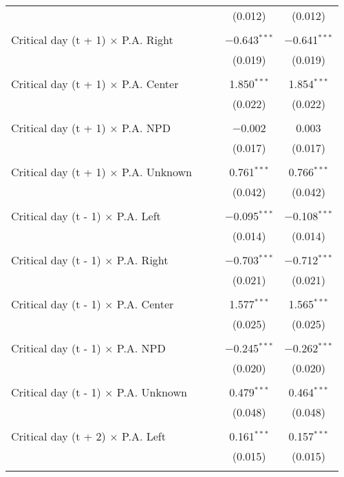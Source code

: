 \documentclass[
]{article}
\begin{document}
\begin{table}[!htbp]
{\begin{tabular}{@{\extracolsep{5pt}}lcccc}
  &  &  & (0.012) & (0.012) \\ 
  & & & & \\ 
 Critical day (t + 1) $\times$ P.A. Right &  &  & $-$0.643$^{***}$ & $-$0.641$^{***}$ \\ 
  &  &  & (0.019) & (0.019) \\ 
  & & & & \\ 
 Critical day (t + 1) $\times$ P.A. Center &  &  & 1.850$^{***}$ & 1.854$^{***}$ \\ 
  &  &  & (0.022) & (0.022) \\ 
  & & & & \\ 
 Critical day (t + 1) $\times$ P.A. NPD &  &  & $-$0.002 & 0.003 \\ 
  &  &  & (0.017) & (0.017) \\ 
  & & & & \\ 
 Critical day (t + 1) $\times$ P.A. Unknown &  &  & 0.761$^{***}$ & 0.766$^{***}$ \\ 
  &  &  & (0.042) & (0.042) \\ 
  & & & & \\ 
 Critical day (t - 1) $\times$ P.A. Left &  &  & $-$0.095$^{***}$ & $-$0.108$^{***}$ \\ 
  &  &  & (0.014) & (0.014) \\ 
  & & & & \\ 
 Critical day (t - 1) $\times$ P.A. Right &  &  & $-$0.703$^{***}$ & $-$0.712$^{***}$ \\ 
  &  &  & (0.021) & (0.021) \\ 
  & & & & \\ 
 Critical day (t - 1) $\times$ P.A. Center &  &  & 1.577$^{***}$ & 1.565$^{***}$ \\ 
  &  &  & (0.025) & (0.025) \\ 
  & & & & \\ 
 Critical day (t - 1) $\times$ P.A. NPD &  &  & $-$0.245$^{***}$ & $-$0.262$^{***}$ \\ 
  &  &  & (0.020) & (0.020) \\ 
  & & & & \\ 
 Critical day (t - 1) $\times$ P.A. Unknown &  &  & 0.479$^{***}$ & 0.464$^{***}$ \\ 
  &  &  & (0.048) & (0.048) \\ 
  & & & & \\ 
 Critical day (t + 2) $\times$ P.A. Left &  &  & 0.161$^{***}$ & 0.157$^{***}$ \\ 
  &  &  & (0.015) & (0.015) \\ 
  & & & & \\ 

\end{tabular}}
\end{table}
\end{document}
